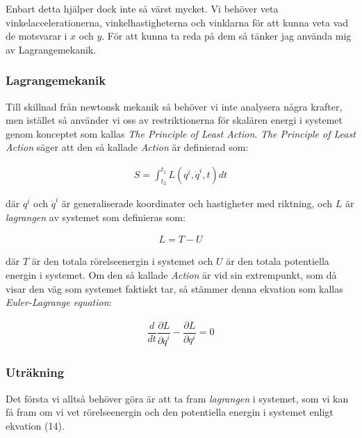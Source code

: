 \documentclass[10pt, a4paper]{amsart}
\begin{document}
Enbart detta hjälper dock inte så värst mycket. 
Vi behöver veta vinkelaccelerationerna, 
vinkelhastigheterna och vinklarna för att kunna veta vad de motsvarar i $ x $ och $ y $.
För att kunna ta reda på dem så tänker jag använda mig av Lagrangemekanik.

\subsubsection*{\textbf{Lagrangemekanik}}
\hspace{5ex} 

Till skillnad från newtonsk mekanik så behöver vi inte analysera några krafter, 
men istället så använder vi oss av restriktionerna för skalären energi i systemet genom konceptet som kallas \textit{The Principle of Least Action}.
\textit{The Principle of Least Action} säger att den så kallade \textit{Action} är definierad som: \bigskip 

\begin{align}
    S = \int_{t_2}^{t_1} L(q^{i}, \dot q^{i}, t)dt
\end{align} \bigskip 

där $ q^{i} $ och $ \dot q^{i} $ är generaliserade koordinater och hastigheter med riktning, 
och $ L $ är \textit{lagrangen} av systemet som definieras som: \bigskip 

\begin{align}
    L = T - U
\end{align} \bigskip 

där $ T $ är den totala rörelseenergin i systemet och $ U $ är den totala potentiella energin i systemet. 
Om den så kallade \textit{Action} är vid sin extrempunkt, som då visar den väg som systemet faktiskt tar, så stämmer denna ekvation som kallas \textit{Euler-Lagrange equation}: \bigskip 

\begin{align}
    \dfrac{d}{dt}\dfrac{\partial L}{\partial \dot q^{i}} - \dfrac{\partial L}{\partial q^{i}} = 0
\end{align} \bigskip 

\subsubsection*{\textbf{Uträkning}}
\hspace{5ex} 

Det första vi alltså behöver göra är att ta fram \textit{lagrangen} i systemet, 
som vi kan få fram om vi vet rörelseenergin och den potentiella energin i systemet enligt ekvation (14). \bigskip 
\end{document}
